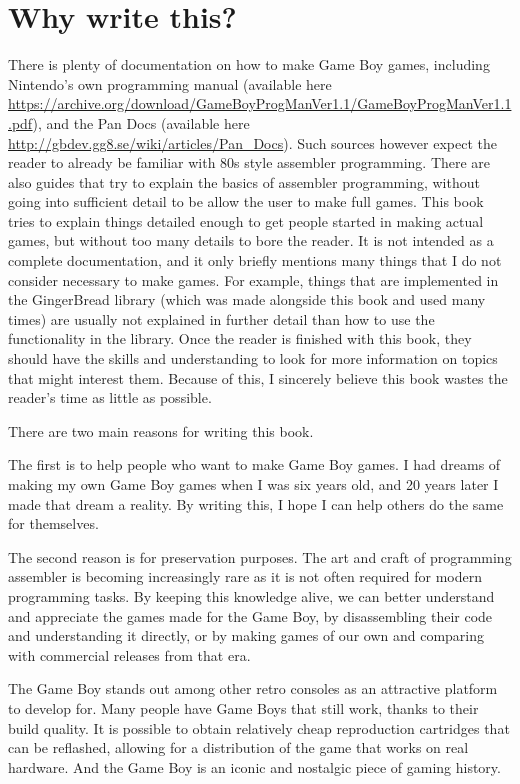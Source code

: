 \documentclass[11pt]{book}
\begin{document}
\section{Why write this?}
There is plenty of documentation on how to make Game Boy games, including Nintendo's own programming manual (available here \url{https://archive.org/download/GameBoyProgManVer1.1/GameBoyProgManVer1.1.pdf}), and the Pan Docs (available here \url{http://gbdev.gg8.se/wiki/articles/Pan_Docs}). Such sources however expect the reader to already be familiar with 80s style assembler programming. There are also guides that try to explain the basics of assembler programming, without going into sufficient detail to be allow the user to make full games. This book tries to explain things detailed enough to get people started in making actual games, but without too many details to bore the reader. It is not intended as a complete documentation, and it only briefly mentions many things that I do not consider necessary to make games. For example, things that are implemented in the GingerBread library (which was made alongside this book and used many times) are usually not explained in further detail than how to use the functionality in the library. Once the reader is finished with this book, they should have the skills and understanding to look for more information on topics that might interest them. Because of this, I sincerely believe this book wastes the reader's time as little as possible.

There are two main reasons for writing this book.

The first is to help people who want to make Game Boy games. I had dreams of making my own Game Boy games when I was six years old, and 20 years later I made that dream a reality. By writing this, I hope I can help others do the same for themselves.

The second reason is for preservation purposes. The art and craft of programming assembler is becoming increasingly rare as it is not often required for modern programming tasks. By keeping this knowledge alive, we can better understand and appreciate the games made for the Game Boy, by disassembling their code and understanding it directly, or by making games of our own and comparing with commercial releases from that era. 

The Game Boy stands out among other retro consoles as an attractive platform to develop for. Many people have Game Boys that still work, thanks to their build quality. It is possible to obtain relatively cheap reproduction cartridges that can be reflashed, allowing for a distribution of the game that works on real hardware. And the Game Boy is an iconic and nostalgic piece of gaming history.
\end{document}
